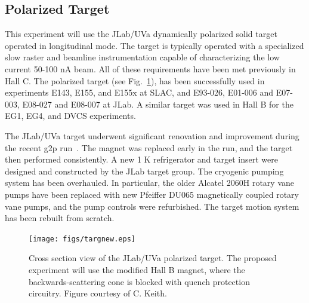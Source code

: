 \subsection{Polarized Target}
\label{POLTARGSEC}
This experiment will use the
JLab/UVa dynamically polarized solid {\TARGET}target operated in longitudinal mode.  
The target is typically operated with a specialized slow raster and beamline instrumentation capable of characterizing the low current 50-100 nA beam.
All of these requirements have been met previously in Hall C.
%
The polarized target (see Fig.~\ref{fig:target}), 
has been successfully used in experiments E143, E155, and E155x at SLAC, and E93-026, E01-006 and E07-003, E08-027 and E08-007 at JLab.
A similar target was used in Hall B for the EG1, EG4, and DVCS experiments. 

The JLab/UVa target underwent significant renovation and improvement during the recent g2p run~\cite{Pierce:2013pua}. The magnet was replaced early in the run, and the target then performed consistently.   A new 1 K refrigerator and target insert were designed and constructed by the JLab target group.  The cryogenic pumping system has been overhauled.  In particular, the older Alcatel 2060H rotary vane pumps have been replaced with new Pfeiffer DU065 magnetically coupled rotary vane pumps, and the pump controls were refurbished. The target motion system has been rebuilt from scratch. %

%
\begin{figure}
\centering
\texttt{[image: figs/targnew.eps]} %
\caption{Cross section view of the JLab/UVa polarized target. The proposed experiment will use the modified Hall B magnet, where the backwards-scattering cone is blocked with quench protection circuitry. Figure courtesy of C. Keith.  \label{fig:target}}
\end{figure}




